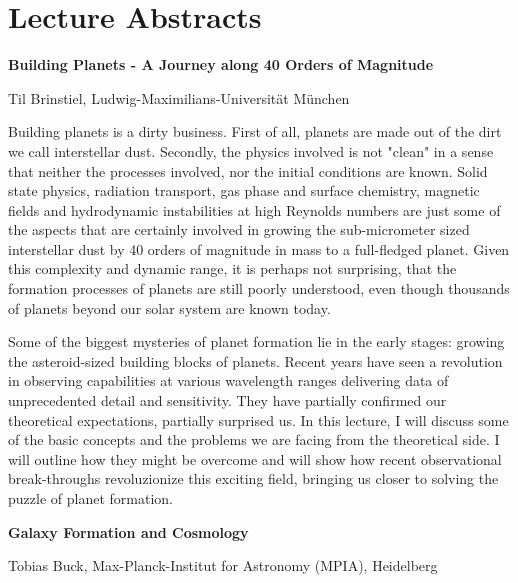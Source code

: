 
\section{Lecture Abstracts}

\begin{center}
{{\large\bfseries Building Planets - A Journey along 40 Orders of Magnitude}\par} \medskip

{\large Til Brinstiel, Ludwig-Maximilians-Universität München\par}
\end{center}

\noindent Building planets is a dirty business. First of all, planets are made out of the dirt we call interstellar dust. Secondly, the physics involved is not "clean" in a sense that neither the processes involved, nor the initial conditions are known. Solid state physics, radiation transport, gas phase and surface chemistry, magnetic fields and hydrodynamic instabilities at high Reynolds numbers are just some of the aspects that are certainly involved in growing the sub-micrometer sized interstellar dust by 40 orders of magnitude in mass to a full-fledged planet. Given this complexity and dynamic range, it is perhaps not surprising, that the formation processes of planets are still poorly understood, even though thousands of planets beyond our solar system are known today.

Some of the biggest mysteries of planet formation lie in the early stages: growing the asteroid-sized building blocks of planets. Recent years have seen a revolution in observing capabilities at various wavelength ranges delivering data of unprecedented detail and sensitivity. They have partially confirmed our theoretical expectations, partially surprised us. In this lecture, I will discuss some of the basic concepts and the problems we are facing from the theoretical side. I will outline how they might be overcome and will show how recent observational break-throughs revoluzionize this exciting field, bringing us closer to solving the puzzle of planet formation.\par
\newpage


\begin{center}
{{\large\bfseries Galaxy Formation and Cosmology}\par} \medskip

{\large Tobias Buck, Max-Planck-Institut for Astronomy (MPIA), Heidelberg\par}
\end{center}


